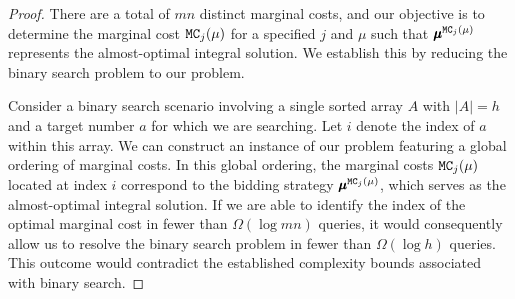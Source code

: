 \begin{proof}
There are a total of \( mn \) distinct marginal costs, and our objective is to determine the marginal cost \( \texttt{MC}_j(\mu) \) for a specified \( j \) and \( \mu \) such that \( \pmb{\mu}^{\texttt{MC}_j(\mu)} \) represents the almost-optimal integral solution. We establish this by reducing the binary search problem to our problem. 

Consider a binary search scenario involving a single sorted array \( A \) with \( |A| = h \) and a target number \( a \) for which we are searching. Let \( i \) denote the index of \( a \) within this array. We can construct an instance of our problem featuring a global ordering of marginal costs. In this global ordering, the marginal costs \( \texttt{MC}_j(\mu) \) located at index \( i \) correspond to the bidding strategy \( \pmb{\mu}^{\texttt{MC}_j(\mu)} \), which serves as the almost-optimal integral solution. If we are able to identify the index of the optimal marginal cost in fewer than \( \Omega(\log mn) \) queries, it would consequently allow us to resolve the binary search problem in fewer than \( \Omega(\log h) \) queries. This outcome would contradict the established complexity bounds associated with binary search.
\end{proof}
